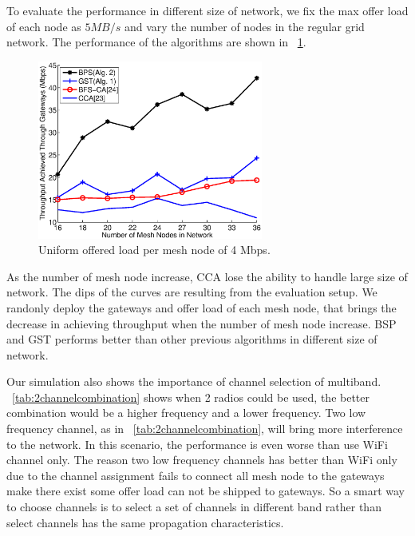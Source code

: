    To evaluate the performance in different size of network, we fix the max offer load of each node as $5MB/s$ and vary the number of nodes in the regular grid network. The performance of the algorithms are shown in ~\ref{fig:varysize}. 
   \begin{figure}
   \centering
   \includegraphics[width=74mm]{figures/varysize}
   \vspace{-0.1in}
   \caption{Uniform offered load per mesh node of 4 Mbps.}                                                                 
   \label{fig:varysize}
   \end{figure}

   As the number of mesh node increase, CCA lose the ability to handle large size of network. The dips of the curves are resulting from the evaluation setup. We randonly deploy the gateways and offer load of each mesh node, that brings the decrease in achieving throughput when the number of mesh node increase. BSP and GST performs better than other previous algorithms in different size of network.


   Our simulation also shows the importance of channel selection of multiband. ~\ref{tab:2channelcombination} shows when 2 radios could be used, the better combination would be a higher frequency and a lower frequency. 
   Two low frequency channel, as in ~\ref{tab:2channelcombination}, will bring more interference to the network.
   In this scenario, the performance is even worse than use WiFi channel only. The reason two low frequency channels has better than WiFi only due to the channel assignment fails to connect all mesh node to the gateways make there exist some offer load can not be shipped to gateways.
   So a smart way to choose channels is to select a set of channels in different band rather than select channels has the same propagation characteristics.

